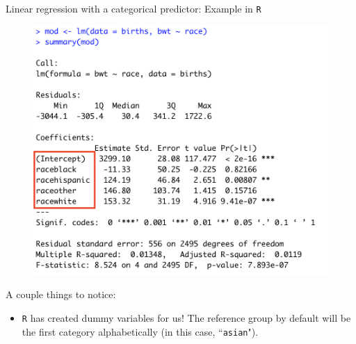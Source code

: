 \documentclass[10pt,t]{beamer}
\begin{document}
\begin{frame}{Linear regression with a categorical predictor: Example in \texttt{R}}

\begin{figure}
	\centering \includegraphics[scale=0.3]{multilevel_cat_lm2.png}
\end{figure}

\vspace{0.1cm}

A couple things to notice:
\begin{itemize}
	\item \texttt{R} has created dummy variables for us! The reference group by default will be the first category alphabetically (in this case, ``\texttt{asian}").
\end{itemize}

\end{frame}
\end{document}
